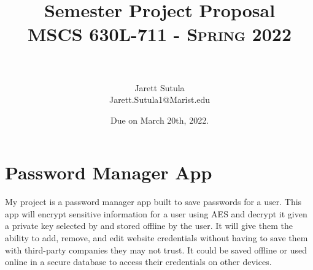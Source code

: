 \documentclass{article}
\title{	
   \huge Semester Project Proposal  \\     	    %
   \normalfont \normalsize
   \textsc{MSCS 630L-711 - Spring 2022} \\[10pt] %
   \horrule{0.5pt} \\[0.25cm] 	%
}
\author{Jarett Sutula \\ \normalsize Jarett.Sutula1@Marist.edu}
\date{Due on March 20th, 2022.} 	%
\numberwithin{equation}{section} %
\numberwithin{figure}{section} %
\numberwithin{table}{section} %
\begin{document}
\maketitle %

\section{Password Manager App}
My project is a password manager app built to save passwords for a user. This app will encrypt sensitive information for a user using AES and decrypt it given a private key selected by and stored offline by the user. It will give them the ability to add, remove, and edit website credentials without having to save them with third-party companies they may not trust. It could be saved offline or used online in a secure database to access their credentials on other devices.
\end{document}
